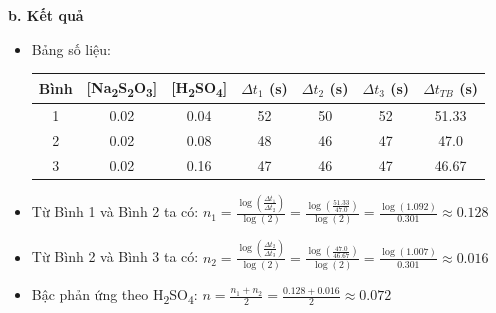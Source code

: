 \textbf{b. Kết quả}
\begin{itemize}
    \item Bảng số liệu:
    \begin{table}[H]
        \centering
        \begin{tabular}{|c|c|c|c|c|c|c|}
            \hline
            \textbf{Bình} & \textbf{[Na\textsubscript{2}S\textsubscript{2}O\textsubscript{3}]} & \textbf{[H\textsubscript{2}SO\textsubscript{4}]} & \textbf{$\Delta t_1$ (s)} & \textbf{$\Delta t_2$ (s)} & \textbf{$\Delta t_3$ (s)} & \textbf{$\Delta t_{TB}$ (s)} \\
            \hline
            1 & 0.02 & 0.04 & 52 & 50 & 52 & 51.33 \\
            \hline
            2 & 0.02 & 0.08 & 48 & 46 & 47 & 47.0 \\
            \hline
            3 & 0.02 & 0.16 & 47 & 46 & 47 & 46.67 \\
            \hline
        \end{tabular}
    \end{table}
    \item Từ Bình 1 và Bình 2 ta có: $n_1 = \frac{\log\left(\frac{\Delta t_1}{\Delta t_2}\right)}{\log(2)} = \frac{\log\left(\frac{51.33}{47.0}\right)}{\log(2)} = \frac{\log(1.092)}{0.301} \approx 0.128$
    \item Từ Bình 2 và Bình 3 ta có: $n_2 = \frac{\log\left(\frac{\Delta t_2}{\Delta t_3}\right)}{\log(2)} = \frac{\log\left(\frac{47.0}{46.67}\right)}{\log(2)} = \frac{\log(1.007)}{0.301} \approx 0.016$
    \item Bậc phản ứng theo H\textsubscript{2}SO\textsubscript{4}: $n = \frac{n_1 + n_2}{2} = \frac{0.128 + 0.016}{2} \approx 0.072$
\end{itemize}

